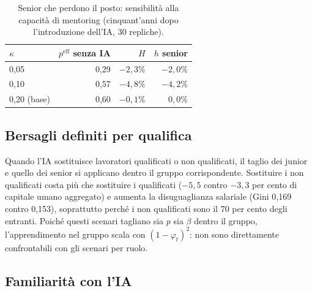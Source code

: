 \documentclass[preprint,12pt,authoryear]{elsarticle}
\begin{document}
\begin{table}[h]\centering\small
\caption{Senior che perdono il posto: sensibilità alla capacità di mentoring (cinquant'anni dopo l'introduzione dell'IA, 30 repliche).}\label{tab:kappa}
\begin{tabular}{@{}lrrr@{}}
\toprule
$\kappa$ & $p^{\mathrm{eff}}$ senza IA & $H$ & $h$ senior \\
\midrule
0,05 & 0,29 & $-2{,}3\%$ & $-2{,}0\%$ \\
0,10 & 0,57 & $-4{,}8\%$ & $-4{,}2\%$ \\
0,20 (base) & 0,60 & $-0{,}1\%$ & $0{,}0\%$ \\
\bottomrule
\end{tabular}
\end{table}

\subsection{Bersagli definiti per qualifica}

Quando l'IA sostituisce lavoratori qualificati o non qualificati, il taglio dei junior e quello dei senior si applicano dentro il gruppo corrispondente. Sostituire i non qualificati costa più che sostituire i qualificati ($-5{,}5$ contro $-3{,}3$ per cento di capitale umano aggregato) e aumenta la disuguaglianza salariale (Gini 0,169 contro 0,153), soprattutto perché i non qualificati sono il 70 per cento degli entranti. Poiché questi scenari tagliano sia $p$ sia $\beta$ dentro il gruppo, l'apprendimento nel gruppo scala con $(1-\varphi_t)^2$: non sono direttamente confrontabili con gli scenari per ruolo.

\subsection{Familiarità con l'IA}
\end{document}
